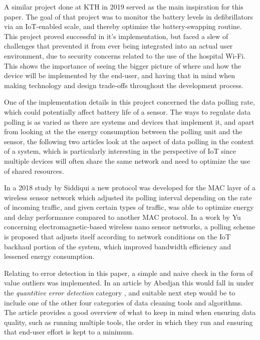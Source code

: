 A similar project done at KTH in 2019 served as the main inspiration for this paper.\cite{hospital} The goal of that project was to monitor the battery levels in defibrillators via an IoT-enabled scale, and thereby optimize the battery-swapping routine. This project proved successful in it's implementation, but faced a slew of challenges that prevented it from ever being integrated into an actual user environment, due to security concerns related to the use of the hospital Wi-Fi. This shows the importance of seeing the bigger picture of where and how the device will be implemented by the end-user, and having that in mind when making technology and design trade-offs throughout the development process.

One of the implementation details in this project concerned the data polling rate, which could potentially affect battery life of a sensor. The ways to regulate data polling is as varied as there are systems and devices that implement it, and apart from looking at the the energy consumption between the polling unit and the sensor, the following two articles look at the aspect of data polling in the context of a system, which is particularly interesting in the perspective of IoT since multiple devices will often share the same network and need to optimize the use of shared resources.

In a 2018 study by Siddiqui \etal \cite{ADP-MAC} a new protocol was developed for the MAC layer of a wireless sensor network which adjusted its polling interval depending on the rate of incoming traffic, and given certain types of traffic, was able to optimize energy and delay performance compared to another MAC protocol. 
In a work by Yu \etal \cite{nanonetworks} concerning electromagnetic-based wireless nano sensor networks, a polling scheme is proposed that adjusts itself according to network conditions on the IoT backhaul portion of the system, which improved bandwidth efficiency and lessened energy consumption. 

Relating to error detection in this paper, a simple and naive check in the form of value outliers was implemented. In an article by Abedjan \etal this would fall in under the \textit{quantitive error detection} category \cite{data-errors}, and suitable next step would be to include one of the other four categories of data cleaning tools and algorithms. The article provides a good overview of what to keep in mind when ensuring data quality, such as running multiple tools, the order in which they run and ensuring that end-user effort is kept to a minimum.